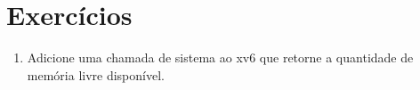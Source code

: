 \section{Exercícios}

\begin{enumerate}

\item Adicione uma chamada de sistema ao xv6
  que retorne a quantidade de memória livre disponível.


\end{enumerate}
